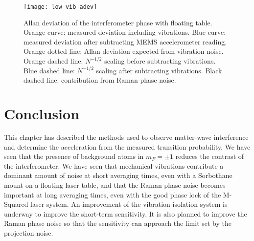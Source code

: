 \nocite{Meunier2015, Fang2016, Dick1990}
\par\noindent
\begin{figure}[htpb!]
  \centering
    \texttt{[image: low\_vib\_adev]}
  \caption[Comparison of Allan deviation in a high and
    low vibration
  environment.]{Allan deviation of the interferometer phase with
    floating table. Orange curve: measured deviation including
    vibrations. Blue curve: measured deviation after subtracting MEMS
    accelerometer reading. Orange dotted line: Allan deviation
    expected from vibration noise. Orange dashed line: $N^{-1/2}$
    scaling before subtracting vibrations. Blue dashed line: $N^{-1/2}$
    scaling after subtracting vibrations. Black dashed line:
    contribution from Raman phase noise. }
  \label{fig:low_vib_adev}
\end{figure}

\section{Conclusion}
This chapter has described the methods used to observe matter-wave
interference and determine the acceleration from the measured transition
probability. We have seen that the presence of background atoms in $m_F = \pm 1$
reduces the contrast of the interferometer. We have seen that
mechanical vibrations contribute a dominant amount of noise at short
averaging times, even with
a Sorbothane mount on a floating laser table, and that the Raman phase
noise becomes important at long averaging times, even with the good
phase lock of the M-Squared laser system. An improvement of the vibration
isolation system is underway to improve the
short-term sensitivity. It is also planned to improve the Raman phase noise so that the sensitivity can approach the limit set by the
projection noise.
